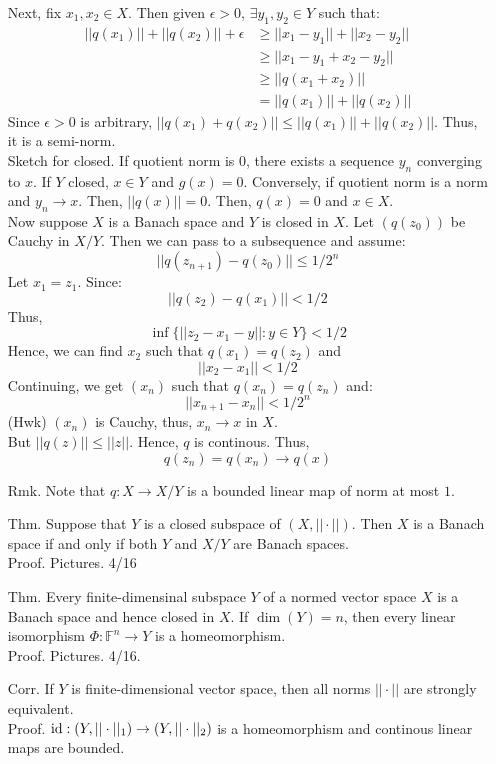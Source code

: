 \documentclass[12pt]{article}
\begin{document}
\begin{itemize}
    Next, fix $x_1, x_2 \in X$. Then given $\epsilon > 0$, $\exists y_1, y_2 \in Y$ such that:
    \begin{align*}
        ||q(x_1)|| + ||q(x_2)|| + \epsilon &\geq ||x_1 - y_1|| + ||x_2 - y_2|| \\
        &\geq ||x_1 - y_1 + x_2 - y_2|| \\
        &\geq ||q(x_1 + x_2)|| \\
        &=  ||q(x_1)|| + ||q(x_2)|| 
    \end{align*}
    Since $\epsilon > 0$ is arbitrary, $||q(x_1) + q(x_2)|| \leq ||q(x_1)|| + ||q(x_2)||$. Thus, it is a semi-norm. \\
    Sketch for closed. If quotient norm is $0$, there exists a sequence $y_n$ converging to $x$. If $Y$ closed, $x \in Y$ and $g(x) = 0$. Conversely, if quotient norm is a norm and $y_n \to x$. Then, $||q(x)|| = 0$. Then, $q(x) = 0$ and $x \in X$. \\
    Now suppose $X$ is a Banach space and $Y$ is closed in $X$. Let $(q(z_0))$ be Cauchy in $X/Y$. Then we can pass to a subsequence and assume: 
    \[ ||q(z_{n+1}) - q(z_0)|| \leq 1/2^n\]
    Let $x_1 = z_1$. Since: 
    \[ ||q(z_2) - q(x_1)|| < 1/2 \]
    Thus, 
    \[\inf\{||z_2 - x_1 - y || : y \in Y \} < 1/2\]
    Hence, we can find $x_2$ such that $q(x_1) = q(z_2)$ and 
    \[||x_2-x_1|| < 1/2 \]
    Continuing, we get $(x_n)$ such that $q(x_n) = q(z_n)$ and: 
    \[ ||x_{n+1} - x_n|| < 1/2^n\]
    (Hwk) $(x_n)$ is Cauchy, thus, $x_n \to x$ in $X$. \\
    But $||q(z)|| \leq ||z||$. Hence, $q$ is continous. Thus, 
    \[q(z_n) = q(x_n) \to q(x)\]
    \item[Rmk.] Note that $q : X \to X/Y$ is a bounded linear map of norm at most $1$. 
    \item[Thm.] Suppose that $Y$ is a closed subspace of $(X, ||\cdot||)$. Then $X$ is a Banach space if and only if both $Y$ and $X/Y$ are Banach spaces. \\
    Proof. Pictures. 4/16
    \item[Thm.] Every finite-dimensinal subspace $Y$ of a normed vector space $X$ is a Banach space and hence closed in $X$. If $\dim(Y) = n$, then every linear isomorphism $\Phi: \mathbb{F}^n \to Y$ is a homeomorphism. \\
    Proof. Pictures. 4/16.
    \item[Corr.] If $Y$ is finite-dimensional vector space, then all norms $||\cdot||$ are strongly equivalent. \\
    Proof. $\operatorname{id}:( Y, ||\cdot||_1) \to (Y, ||\cdot||_2)$ is a homeomorphism and continous linear maps are bounded.

\end{itemize}
\end{document}
